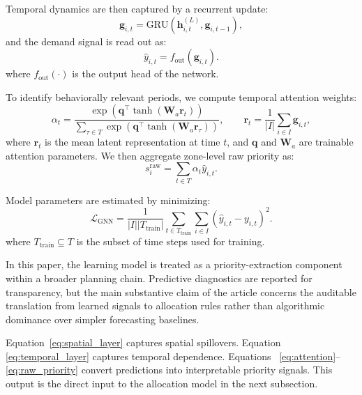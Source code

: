 \documentclass[final,5p,times,twocolumn,authoryear]{elsarticle}
\begin{document}
Temporal dynamics are then captured by a recurrent update:
\begin{equation}
\mathbf{g}_{i,t}=\mathrm{GRU}\left(\mathbf{h}_{i,t}^{(L)},\mathbf{g}_{i,t-1}\right),
\label{eq:temporal_layer}
\end{equation}
and the demand signal is read out as:
\begin{equation}
\hat{y}_{i,t}=f_{\mathrm{out}}(\mathbf{g}_{i,t}).
\label{eq:readout}
\end{equation}
where $f_{\mathrm{out}}(\cdot)$ is the output head of the network.

To identify behaviorally relevant periods, we compute temporal attention weights:
\begin{equation}
\alpha_t = \frac{\exp\left(\mathbf{q}^\top\tanh(\mathbf{W}_a\mathbf{r}_t)\right)}
{\sum_{\tau\in T}\exp\left(\mathbf{q}^\top\tanh(\mathbf{W}_a\mathbf{r}_{\tau})\right)},
\qquad
\mathbf{r}_t=\frac{1}{|I|}\sum_{i\in I}\mathbf{g}_{i,t},
\label{eq:attention}
\end{equation}
where $\mathbf{r}_t$ is the mean latent representation at time $t$, and $\mathbf{q}$ and
$\mathbf{W}_a$ are trainable attention parameters. We then aggregate zone-level raw
priority as:
\begin{equation}
s_i^{\mathrm{raw}}=\sum_{t\in T}\alpha_t\hat{y}_{i,t}.
\label{eq:raw_priority}
\end{equation}

Model parameters are estimated by minimizing:
\begin{equation}
\mathcal{L}_{\mathrm{GNN}}=
\frac{1}{|I||T_{\mathrm{train}}|}
\sum_{t\in T_{\mathrm{train}}}\sum_{i\in I}(\hat{y}_{i,t}-y_{i,t})^2.
\label{eq:loss}
\end{equation}
where $T_{\mathrm{train}}\subseteq T$ is the subset of time steps used for training.

In this paper, the learning model is treated as a priority-extraction component within a
broader planning chain. Predictive diagnostics are reported for transparency, but the main
substantive claim of the article concerns the auditable translation from learned signals to
allocation rules rather than algorithmic dominance over simpler forecasting baselines.

Equation~\eqref{eq:spatial_layer} captures spatial spillovers. Equation~
\eqref{eq:temporal_layer} captures temporal dependence. Equations~
\eqref{eq:attention}--\eqref{eq:raw_priority} convert predictions into interpretable
priority signals. This output is the direct input to the allocation model in the next
subsection.
\end{document}
